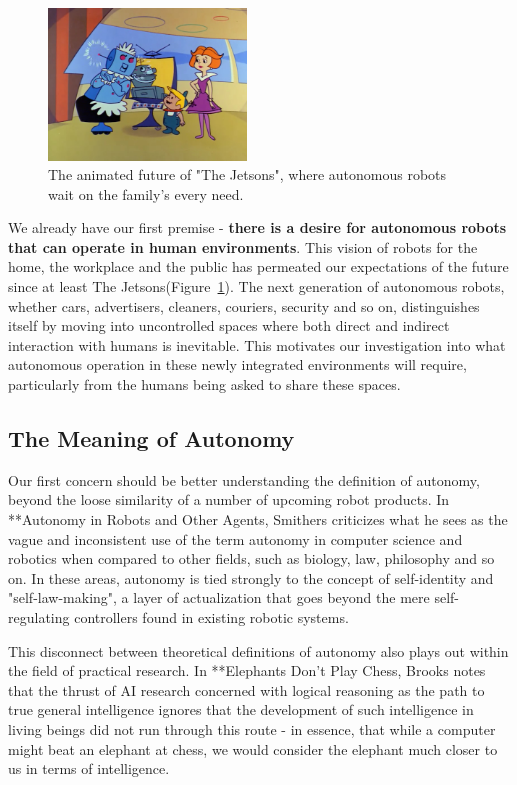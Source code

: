 \documentclass{sfuthesis}
\begin{document}
\begin{figure}
    \centering
    \includegraphics[width=0.47\textwidth]{jetsons.jpg} 

    \caption{The animated future of "The Jetsons", where autonomous robots wait on the family's every need.}
    \label{fig:jetsons}
\end{figure}

We already have our first premise - \textbf{there is a desire for autonomous robots that can operate in human environments}. This vision of robots for the home, the workplace and the public has permeated our expectations of the future since at least The Jetsons(Figure~\ref{fig:jetsons}). The next generation of autonomous robots, whether cars, advertisers, cleaners, couriers, security and so on, distinguishes itself by moving into uncontrolled spaces where both direct and indirect interaction with humans is inevitable. This motivates our investigation into what autonomous operation in these newly integrated environments will require, particularly from the humans being asked to share these spaces.

\subsection{The Meaning of Autonomy}

Our first concern should be better understanding the definition of autonomy, beyond the loose similarity of a number of upcoming robot products. In **Autonomy in Robots and Other Agents, Smithers criticizes what he sees as the vague and inconsistent use of the term autonomy in computer science and robotics when compared to other fields, such as biology, law, philosophy and so on. In these areas, autonomy is tied strongly to the concept of self-identity and "self-law-making", a layer of actualization that goes beyond the mere self-regulating controllers found in existing robotic systems. 

This disconnect between theoretical definitions of autonomy also plays out within the field of practical research. In **Elephants Don't Play Chess, Brooks notes that the thrust of AI research concerned with logical reasoning as the path to true general intelligence ignores that the development of such intelligence in living beings did not run through this route - in essence, that while a computer might beat an elephant at chess, we would consider the elephant much closer to us in terms of intelligence.
\end{document}
